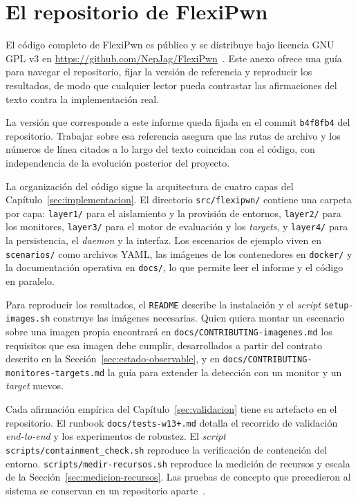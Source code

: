 \chapter{El repositorio de FlexiPwn}
\label{anexo:repositorio}

El código completo de FlexiPwn es público y se distribuye bajo licencia GNU
GPL v3 en \url{https://github.com/NepJag/FlexiPwn}~\cite{flexipwn}. Este anexo
ofrece una guía para navegar el repositorio, fijar la versión de referencia y reproducir los
resultados, de modo que cualquier lector pueda contrastar las afirmaciones del
texto contra la implementación real.

La versión que corresponde a este informe queda fijada en el commit
\texttt{b4f8fb4} del repositorio. Trabajar sobre esa referencia asegura que
las rutas de archivo y los números de línea citados a lo largo del texto
coincidan con el código, con independencia de la evolución posterior del
proyecto.

La organización del código sigue la arquitectura de cuatro capas del
Capítulo~\ref{sec:implementacion}. El directorio \texttt{src/flexipwn/}
contiene una carpeta por capa: \texttt{layer1/} para el aislamiento y la
provisión de entornos, \texttt{layer2/} para los monitores, \texttt{layer3/}
para el motor de evaluación y los \textit{targets}, y \texttt{layer4/} para la
persistencia, el \textit{daemon} y la interfaz. Los escenarios de ejemplo
viven en \texttt{scenarios/} como archivos YAML, las imágenes de los
contenedores en \texttt{docker/} y la documentación operativa en
\texttt{docs/}, lo que permite leer el informe y el código en paralelo.

\begin{sloppypar}
    Para reproducir los resultados, el \texttt{README} describe la instalación y
    el \textit{script} \texttt{setup-images.sh} construye las imágenes necesarias.
    Quien quiera montar un escenario sobre una imagen propia encontrará en
    \texttt{docs/CONTRIBUTING-imagenes.md} los requisitos que esa imagen debe
    cumplir, desarrollados a partir del contrato descrito en la
    Sección~\ref{sec:estado-observable}, y en
    \texttt{docs/CONTRIBUTING-monitores-targets.md} la guía para extender la
    detección con un monitor y un \textit{target} nuevos.
    
    Cada afirmación empírica del Capítulo~\ref{sec:validacion} tiene su artefacto
    en el repositorio. El runbook \texttt{docs/tests-w13+.md} detalla el recorrido
    de validación \textit{end-to-end} y los experimentos de robustez. El
    \textit{script} \texttt{scripts/containment\_check.sh} reproduce la
    verificación de contención del entorno. \texttt{scripts/medir-recursos.sh}
    reproduce la medición de recursos y escala de la
    Sección~\ref{sec:medicion-recursos}. Las pruebas de concepto que precedieron al
    sistema se conservan en un repositorio aparte~\cite{flexipwn-poc}.
\end{sloppypar}